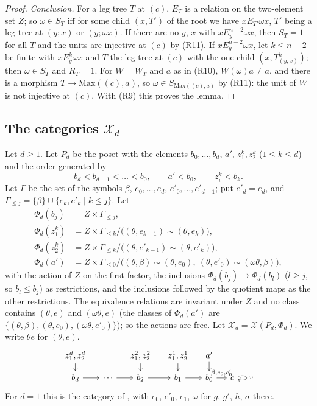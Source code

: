 \documentclass[11pt]{amsart}
\theoremstyle{definition}
\newcommand{\Max}{\mathrm{Max}}
\newcommand{\cX}{\mathcal X}
\begin{document}
\begin{proof}
\emph{Conclusion.} For a leg tree $T$ at $(c)$, $E_T$ is a relation on
the two-element set $Z$; so $\omega\in S_T$ iff for some child
$(x,T')$ of the root we have $x\mathrel{E_{T'}}\omega x$, $T'$ being a
leg tree at $(y;x)$ or $(y;\omega x)$. If there are no $y$, $x$ with
$x\mathrel{E^{n-2}_y}\omega x$, then $S_T=1$ for all $T$ and the units
are injective at $(c)$ by (R11). If $x\mathrel{E^{n-2}_y}\omega x$,
let $k\le n-2$ be finite with $x\mathrel{E^k_y}\omega x$ and $T$ the
leg tree at $(c)$ with the one child $(x,T^k_{(y;x)})$; then
$\omega\in S_T$ and $R_T=1$. For $W=W_T$ and $a$ as in (R10),
$W(\omega)a\ne a$, and there is a morphism $T\to\Max((c),a)$, so
$\omega\in S_{\Max((c),a)}$ by (R11): the unit of $W$ is not injective
at $(c)$. With (R9) this proves the lemma.
\end{proof}

\subsection*{The categories $\cX_d$}
Let $d\ge1$. Let $P_d$ be the poset with the elements $b_0,\dots,b_d$,
$a'$, $z^k_1,z^k_2$ ($1\le k\le d$) and the order generated by
\[
b_d<b_{d-1}<\dots<b_0,\qquad a'<b_0,\qquad z^k_i<b_k .
\]
Let $\Gamma$ be the set of the symbols $\beta$, $e_0,\dots,e_d$,
$e'_0,\dots,e'_{d-1}$; put $e'_d=e_d$, and $\Gamma_{\le j}=\{\beta\}
\cup\{e_k,e'_k\mid k\le j\}$. Let
\begin{align*}
\Phi_d(b_j)&=Z\times\Gamma_{\le j},\\
\Phi_d(z^k_1)&=Z\times\Gamma_{\le k}/\bigl((\theta,e_{k-1})\sim
(\theta,e_k)\bigr),\\
\Phi_d(z^k_2)&=Z\times\Gamma_{\le k}/\bigl((\theta,e'_{k-1})\sim
(\theta,e'_k)\bigr),\\
\Phi_d(a')&=Z\times\Gamma_{\le0}/\bigl((\theta,\beta)\sim(\theta,e_0),
\ (\theta,e'_0)\sim(\omega\theta,\beta)\bigr),
\end{align*}
with the action of $Z$ on the first factor, the inclusions
$\Phi_d(b_j)\to\Phi_d(b_l)$ ($l\ge j$, so $b_l\le b_j$) as
restrictions, and the inclusions followed by the quotient maps as the
other restrictions. The equivalence relations are invariant under $Z$
and no class contains $(\theta,e)$ and $(\omega\theta,e)$ (the classes
of $\Phi_d(a')$ are $\{(\theta,\beta),(\theta,e_0),(\omega\theta,
e'_0)\}$); so the actions are free. Let $\cX_d=\cX(P_d,\Phi_d)$. We
write $\theta e$ for $(\theta,e)$.
\[
\begin{tikzcd}[column sep=small,row sep=small]
z^d_1,z^d_2\ar[d]&&z^2_1,z^2_2\ar[d]&z^1_1,z^1_2\ar[d]&a'\ar[d]&\\
b_d\ar[r]&\cdots\ar[r]&b_2\ar[r]&b_1\ar[r]&b_0\ar[r,"{\beta,e_0,e'_0}"]&c
\ar[loop right,"\omega"]
\end{tikzcd}
\]
For $d=1$ this is the category of \cite[Ex.~6.19]{Strings}, with
$e_0$, $e'_0$, $e_1$, $\omega$ for $g$, $g'$, $h$, $\sigma$ there.
\end{document}
